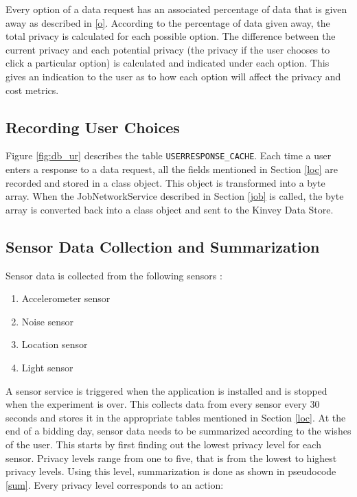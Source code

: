 Every option of a data request has an associated percentage of data that is given away as described in \ref{o}. According to the percentage of data given away, the total privacy is calculated for each possible option. The difference between the current privacy and each potential privacy (the privacy if the user chooses to click a particular option) is calculated and indicated under each option. This gives an indication to the user as to how each option will affect the privacy and cost metrics.

\subsection{Recording User Choices}

Figure \ref{fig:db_ur} describes the table \texttt{USERRESPONSE\_CACHE}. Each time a user enters a response to a data request, all the fields mentioned in Section
\ref{loc} are recorded and stored in a class object. This object is transformed into a byte array.
When the JobNetworkService described in Section \ref{job} is called, the byte array is converted back into a class object and sent to the Kinvey Data Store.

\subsection{Sensor Data Collection and Summarization} 

Sensor data is collected from the following sensors :

\begin{enumerate}
	\item Accelerometer sensor
	\item Noise sensor
    \item Location sensor
    \item Light sensor
\end{enumerate}

A sensor service is triggered when the application is installed and is stopped when the experiment is over. This collects data from every sensor
every 30 seconds and stores it in the appropriate tables mentioned in Section \ref{loc}.
At the end of a bidding day, sensor data needs to be summarized according to the wishes of the user. This starts by first finding out the lowest privacy level for each sensor. Privacy levels range from one to five, that is from the lowest to highest privacy levels. Using this level,
summarization is done as shown in pseudocode \ref{sum}. Every privacy level corresponds to an action:

